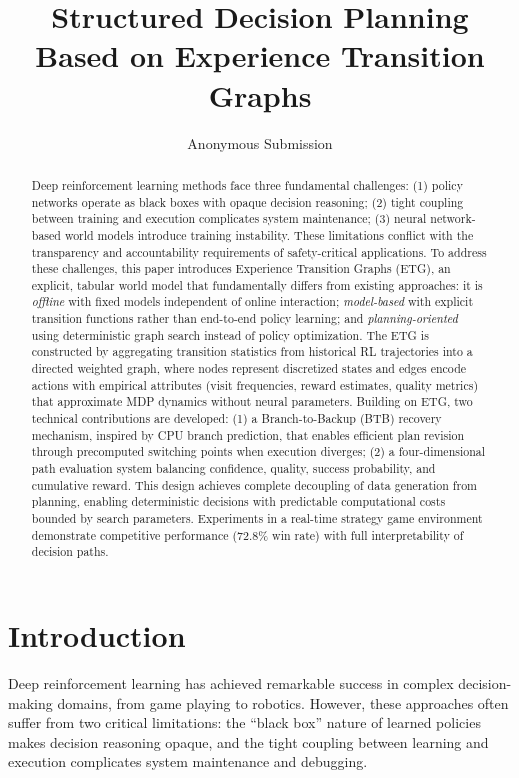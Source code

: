 \documentclass[letterpaper]{article}
\title{Structured Decision Planning Based on Experience Transition Graphs}
\author{
    Anonymous Submission
}
\begin{document}
\maketitle

\begin{abstract}
Deep reinforcement learning methods face three fundamental challenges: (1) policy networks operate as black boxes with opaque decision reasoning; (2) tight coupling between training and execution complicates system maintenance; (3) neural network-based world models introduce training instability. These limitations conflict with the transparency and accountability requirements of safety-critical applications. To address these challenges, this paper introduces Experience Transition Graphs (ETG), an explicit, tabular world model that fundamentally differs from existing approaches: it is \textit{offline} with fixed models independent of online interaction; \textit{model-based} with explicit transition functions rather than end-to-end policy learning; and \textit{planning-oriented} using deterministic graph search instead of policy optimization. The ETG is constructed by aggregating transition statistics from historical RL trajectories into a directed weighted graph, where nodes represent discretized states and edges encode actions with empirical attributes (visit frequencies, reward estimates, quality metrics) that approximate MDP dynamics without neural parameters. Building on ETG, two technical contributions are developed: (1) a Branch-to-Backup (BTB) recovery mechanism, inspired by CPU branch prediction, that enables efficient plan revision through precomputed switching points when execution diverges; (2) a four-dimensional path evaluation system balancing confidence, quality, success probability, and cumulative reward. This design achieves complete decoupling of data generation from planning, enabling deterministic decisions with predictable computational costs bounded by search parameters. Experiments in a real-time strategy game environment demonstrate competitive performance (72.8\% win rate) with full interpretability of decision paths.
\end{abstract}

\section{Introduction}

Deep reinforcement learning has achieved remarkable success in complex decision-making domains, from game playing to robotics. However, these approaches often suffer from two critical limitations: the ``black box'' nature of learned policies makes decision reasoning opaque, and the tight coupling between learning and execution complicates system maintenance and debugging.
\end{document}
